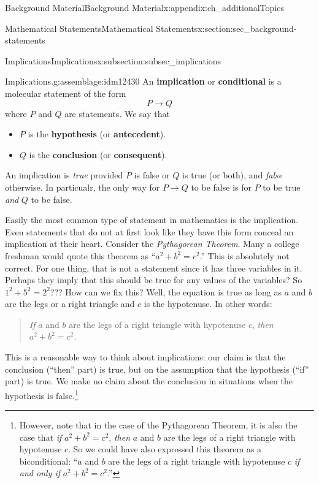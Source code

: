 \documentclass[oneside,10pt,]{book}
\newcommand{\terminology}[1]{\textbf{#1}}
\numberwithin{equation}{chapter}
\def\imp{\rightarrow}
\begin{document}
\begin{appendixptx}{Background Material}{}{Background Material}{}{}{x:appendix:ch_additionalTopics}
\begin{sectionptx}{Mathematical Statements}{}{Mathematical Statements}{}{}{x:section:sec_background-statements}
%
%
\typeout{************************************************}
\typeout{************************************************}
%
\begin{subsectionptx}{Implications}{}{Implications}{}{}{x:subsection:subsec_implications}
\begin{assemblage}{Implications.}{g:assemblage:idm12430}%
An \terminology{implication} or \terminology{conditional} is a molecular statement of the form%
\begin{equation*}
P \imp Q
\end{equation*}
where \(P\) and \(Q\) are statements.  We say that%
\begin{itemize}[label=\textbullet]
\item{}\(P\) is the \terminology{hypothesis} (or \terminology{antecedent}).%
\item{}\(Q\) is the \terminology{conclusion} (or \terminology{consequent}).%
\end{itemize}
%
\par
An implication is \emph{true} provided \(P\) is false or  \(Q\) is true (or both), and \emph{false} otherwise.  In particualr, the only way for \(P \imp Q\) to be false is for \(P\) to be true \emph{and} \(Q\) to be false.%
\end{assemblage}
Easily the most common type of statement in mathematics is the implication. Even statements that do not at first look like they have this form conceal an implication at their heart. Consider the \emph{Pythagorean Theorem}. Many a college freshman would quote this theorem as ``\(a^2 + b^2 = c^2\).'' This is absolutely not correct. For one thing, that is not a statement since it has three variables in it. Perhaps they imply that this should be true for any values of the variables?  So \(1^2 + 5^2 = 2^2\)??? How can we fix this? Well, the equation is true as long as \(a\) and \(b\) are the legs or a right triangle and \(c\) is the hypotenuse. In other words:%
\begin{quote}%
\emph{If} \(a\) and \(b\) are the legs of a right triangle with hypotenuse \(c\), \emph{then} \(a^2 + b^2 = c^2\).%
\end{quote}
This is a reasonable way to think about implications: our claim is that the conclusion (``then'' part) is true, but on the assumption that the hypothesis (``if'' part) is true. We make no claim about the conclusion in situations when the hypothesis is false.\footnote{However, note that in the case of the Pythagorean Theorem, it is also the case that \emph{if} \(a^2 + b^2 = c^2\), \emph{then} \(a\) and \(b\) are the legs of a right triangle with hypotenuse \(c\).  So we could have also expressed this theorem as a biconditional: ``\(a\) and \(b\) are the legs of a right triangle with hypotenuse \(c\) \emph{if and only if} \(a^2 + b^2 = c^2\).''\label{g:fn:idm12479}}%

\end{subsectionptx}
\end{sectionptx}
\end{appendixptx}
\end{document}
